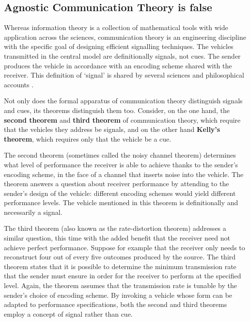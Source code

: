 \subsection{{\sc Agnostic Communication Theory} is false}

Whereas information theory is a collection of mathematical tools with wide application across the sciences, communication theory is an engineering discipline with the specific goal of designing efficient signalling techniques.
The vehicles transmitted in the central model are definitionally signals, not cues.
The sender produces the vehicle in accordance with an encoding scheme shared with the receiver.
This definition of `signal' is shared by several sciences \citep{shannon1948mathematicala,maynardsmith2003animal} and philosophical accounts \citep[$\S$6]{millikan2004varieties} \citep{bergstrom2011transmission}.

Not only does the formal apparatus of communication theory distinguish signals and cues, its theorems distinguish them too.
Consider, on the one hand, the \textbf{second theorem} and \textbf{third theorem} of communication theory, which require that the vehicles they address be signals, and on the other hand \textbf{Kelly's theorem}, which requires only that the vehicle be a cue.

The second theorem (sometimes called the noisy channel theorem) determines what level of performance the receiver is able to achieve thanks to the sender's encoding scheme, in the face of a channel that inserts noise into the vehicle.
The theorem answers a question about receiver performance by attending to the sender's design of the vehicle: different encoding schemes would yield different performance levels.
The vehicle mentioned in this theorem is definitionally and necessarily a signal.

The third theorem (also known as the rate-distortion theorem) addresses a similar question, this time with the added benefit that the receiver need not achieve perfect performance.
Suppose for example that the receiver only needs to reconstruct four out of every five outcomes produced by the source.
The third theorem states that it is possible to determine the minimum transmission rate that the sender must ensure in order for the receiver to perform at the specified level.
Again, the theorem assumes that the transmission rate is tunable by the sender's choice of encoding scheme.
By invoking a vehicle whose form can be adapted to performance specifications, both the second and third theorems employ a concept of signal rather than cue.

